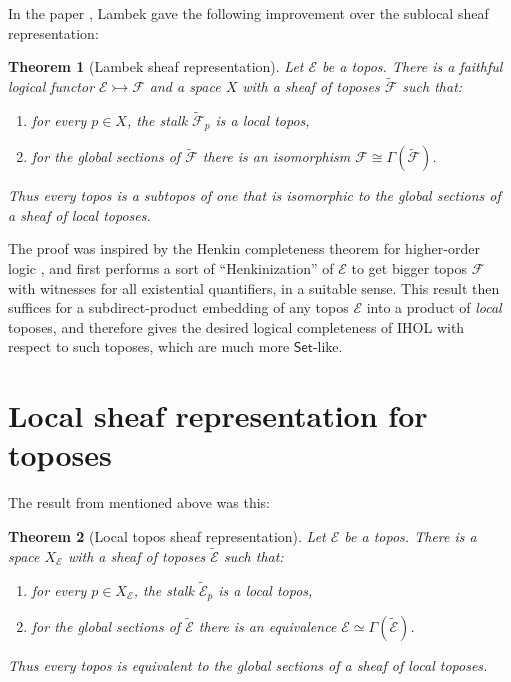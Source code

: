 \documentclass[12pt]{article}
\newcommand{\E}{\ensuremath{\mathcal{E}}}
\newcommand{\Set}{\ensuremath{\mathsf{Set}}}
\newtheorem*{theorem*}{Theorem}
\theoremstyle{remark}
\theoremstyle{definition}
\begin{document}
In the paper \cite{L1}, Lambek gave the following improvement over the sublocal sheaf representation:

\begin{theorem*}[Lambek sheaf representation]
Let $\E$ be a topos.  
There is a faithful logical functor $\E\rightarrowtail\mathcal{F}$ 
and a space $X$ with a sheaf of toposes 
$\widetilde{\mathcal{F}}$ such that:
\begin{enumerate}
\item for every $p\in X$, the stalk $\widetilde{\mathcal{F}}_p$ is a  local topos, 
\item for the global sections of $\widetilde{\mathcal{F}}$ there is an isomorphism $\mathcal{F} \cong \Gamma(\widetilde{\mathcal{F}}) $.
\end{enumerate}
Thus every topos is a  subtopos of one that is isomorphic to the global sections of a sheaf of  local toposes.  
\end{theorem*}
\medskip
%
The proof was inspired by the Henkin completeness theorem for higher-order logic \cite{H}, and first performs a sort of ``Henkinization'' of $\E$ to get bigger topos $\mathcal{F}$ with witnesses for all existential quantifiers, in a suitable sense. This result then suffices for a subdirect-product embedding of any topos $\E$ into a product of \emph{local} toposes, and therefore gives the desired logical completeness of IHOL with respect to such toposes, which are much more $\Set$-like.

\section{Local sheaf representation for toposes}\label{section:localtopos}

The result from \cite{A} mentioned above was this:

\begin{theorem*}[Local topos sheaf representation]\label{theorem:local}
Let $\E$ be a topos.  
There is a space $X_\E$ with a sheaf of toposes $\widetilde{\E}$ such that:
\begin{enumerate}
\item for every $p\in X_\E$, the stalk $\widetilde{\E}_p$ is a local topos, 
\item for the global sections of $\widetilde{\E}$  there is an equivalence $\E\simeq \Gamma(\widetilde{\E})$.
\end{enumerate}
Thus every topos is equivalent to the global sections of a sheaf of local toposes.  
\end{theorem*}
\end{document}
